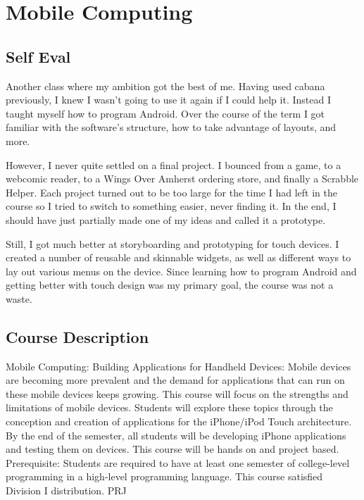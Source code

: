 \section{Mobile Computing}

\begin{meta}
\end{meta}

\subsection*{Self Eval}
Another class where my ambition got the best of me. Having used cabana
previously, I knew I wasn't going to use it again if I could help it.
Instead I taught myself how to program Android. Over the course of the
term I got familiar with the software's structure, how to take advantage
of layouts, and more.

However, I never quite settled on a final project. I bounced from a
game, to a webcomic reader, to a Wings Over Amherst ordering store, and
finally a Scrabble Helper. Each project turned out to be too large for
the time I had left in the course so I tried to switch to something
easier, never finding it. In the end, I should have just partially made
one of my ideas and called it a prototype.

Still, I got much better at storyboarding and prototyping for touch
devices. I created a number of reusable and skinnable widgets, as well
as different ways to lay out various menus on the device. Since learning
how to program Android and getting better with touch design was my
primary goal, the course was not a waste.


\subsection*{Course Description}
Mobile Computing: Building Applications for Handheld Devices: Mobile devices
are becoming more prevalent and the demand for applications that can run on
these mobile devices keeps growing. This course will focus on the strengths and
limitations of mobile devices. Students will explore these topics through the
conception and creation of applications for the iPhone/iPod Touch architecture.
By the end of the semester, all students will be developing iPhone applications
and testing them on devices. This course will be hands on and project based.
Prerequisite: Students are required to have at least one semester of
college-level programming in a high-level programming language. This course
satisfied Division I distribution. PRJ
